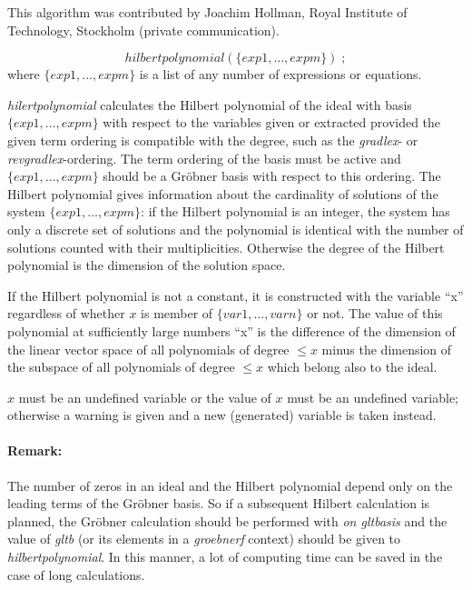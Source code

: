 This algorithm was contributed by {\sc Joachim Hollman}, Royal
Institute of Technology, Stockholm (private communication).

\[
hilbertpolynomial (\{exp1, \ldots , expm\})\;;
\]
where $\{exp1, \ldots , expm\}$ is a list of any number of expressions
or equations.

\emph{hilertpolynomial} calculates the Hilbert polynomial of the ideal
with basis $\{exp1, \ldots , expm\}$ with respect to the
variables given or extracted provided the given term ordering is
compatible with the degree, such as the \emph{gradlex}- or \emph{revgradlex}-ordering.
The term ordering of the basis
must be active and $\{exp1, \ldots, expm\}$ should be a
Gr\"obner basis with respect to this ordering. The Hilbert polynomial
gives information about the cardinality of solutions of the system
$\{exp1, \ldots , expm\}$: if the Hilbert polynomial is an
integer, the system has only a discrete set of solutions and the
polynomial is identical with the number of solutions counted with
their multiplicities. Otherwise the degree of the Hilbert
polynomial is the dimension of the solution space.

If the Hilbert polynomial is not a constant, it is constructed with the
variable ``x'' regardless of whether $x$ is member of
$\{var1, \ldots , varn\}$ or not. The value of this polynomial at
sufficiently large numbers  ``x'' is the difference
of the dimension of the linear vector space of all polynomials of degree
$ \leq x $ minus the dimension of the subspace of all polynomials of
degree $\leq x $ which belong also to the ideal.

$x$ must be an undefined variable or the value of $x$ must be an undefined
variable; otherwise a warning is given and a new (generated) variable
is taken instead.

\paragraph{Remark:} The number of zeros in an ideal and the
Hilbert polynomial depend only on the leading terms of the
Gr\"obner basis. So if a subsequent Hilbert calculation is planned, the
Gr\"obner calculation should be performed with \emph{on gltbasis} and
the value of \emph{gltb} (or its elements in a \emph{groebnerf} context) should be
given to \emph{hilbertpolynomial}. In this manner, a lot of computing time can be
saved in the case of long calculations.

